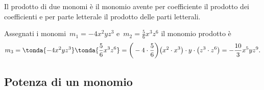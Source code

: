 \begin{definizione}
 Il prodotto di due monomi è il monomio avente
per coefficiente il prodotto dei coefficienti e per parte letterale il
prodotto delle parti letterali.
\end{definizione}

\begin{exrig}
 \begin{esempio}
Assegnati i monomi~\(m_{1}=-4x^{2}yz^{3}\) e~\(m_{2}=\frac{5}{6}x^{3}z^{6}\)
il monomio prodotto è
\[m_{3}=\tonda{-4x^{2}yz^{3}} \tonda{\frac{5}{6}x^{3}z^{6}}=
\bigg(-4\cdot {\frac{5}{6}}\bigg)\big(x^{2}\cdot x^{3}\big)\cdot 
y\cdot \big(z^{3}\cdot z^{6}\big)=-\frac{10}{3}x^{5}yz^{9}.\]
 \end{esempio}
\end{exrig}


% 

% 


\subsection{Potenza di un monomio}
\label{subsec:09_monomi_potenza}

